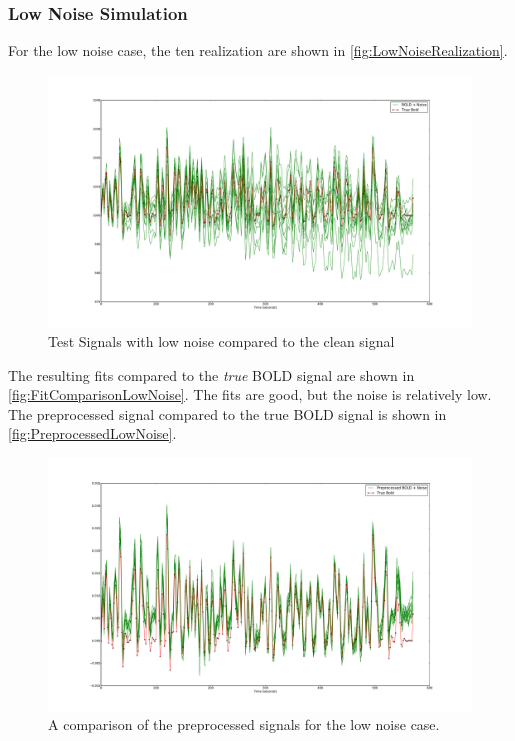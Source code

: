 \subsubsection{Low Noise Simulation}
For the low noise case, the ten realization are shown in \autoref{fig:LowNoiseRealization}.
\begin{figure}
\label{fig:LowNoiseRealization}
\includegraphics[trim=6cm 3cm 6cm 3cm,width=16cm]{images/realization_lownoise}
\caption{Test Signals with low noise compared to the clean signal}
\end{figure}

The resulting fits compared to the \emph{true} BOLD signal are shown in \autoref{fig:FitComparisonLowNoise}.
The fits are good, but the noise is relatively low. The preprocessed signal compared
to the true BOLD signal is shown in \autoref{fig:PreprocessedLowNoise}.

\begin{figure}
\label{fig:PreprocessedLowNoise}
\includegraphics[trim=6cm 3cm 6cm 3cm,width=16cm]{images/preprocessed_lownoise}
\caption{A comparison of the preprocessed signals for the low noise case.}
\end{figure}

